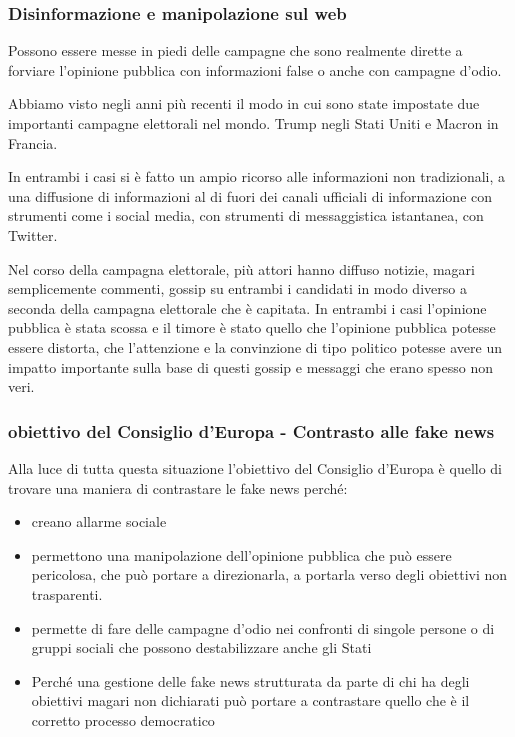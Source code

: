 \subsubsection{Disinformazione e manipolazione sul web}
Possono essere messe in piedi delle campagne che sono realmente dirette a forviare l'opinione pubblica con informazioni false o anche con campagne d'odio. \par 
Abbiamo visto negli anni più recenti il modo in cui sono state impostate due importanti campagne elettorali nel mondo. Trump negli Stati Uniti e Macron in Francia. \par
In entrambi i casi si è fatto un ampio ricorso alle informazioni non tradizionali, a una diffusione di informazioni al di fuori dei canali ufficiali di informazione con strumenti come i social media, con strumenti di messaggistica istantanea, con Twitter. \par
Nel corso della campagna elettorale, più attori hanno diffuso notizie, magari semplicemente commenti, gossip su entrambi i candidati in modo diverso a seconda della campagna elettorale che è capitata. In entrambi i casi l'opinione pubblica è stata scossa e il timore è stato quello che l'opinione pubblica potesse essere distorta, che l'attenzione e la convinzione di tipo politico potesse avere un impatto importante sulla base di questi gossip e messaggi che erano spesso non veri. \par
\subsubsection{obiettivo del Consiglio d'Europa - Contrasto alle fake news}
Alla luce di tutta questa situazione l'obiettivo del Consiglio d'Europa è quello di trovare una maniera di contrastare le fake news perché:
\begin{itemize}
    \item creano allarme sociale
    \item permettono una manipolazione dell'opinione pubblica che può essere pericolosa, che può portare a direzionarla, a portarla verso degli obiettivi non trasparenti.
    \item permette di fare delle campagne d'odio nei confronti di singole persone o di gruppi sociali che possono destabilizzare anche gli Stati
    \item Perché una gestione delle fake news strutturata da parte di chi ha degli obiettivi magari non dichiarati può portare a contrastare quello che è il corretto processo democratico
\end{itemize}

